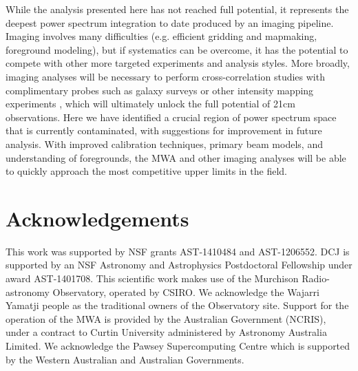 \documentclass[iop]{emulateapj}
\begin{document}
While the analysis presented here has not reached full potential, it represents the deepest power spectrum 
integration to date produced by an imaging pipeline. Imaging involves many difficulties (e.g. 
efficient gridding and mapmaking, foreground modeling), but if systematics can be 
overcome, it has the potential to compete with other more targeted experiments and 
analysis styles. 
More broadly, imaging analyses will be necessary to perform cross-correlation studies
with complimentary probes such as galaxy surveys or other intensity mapping experiments
 \citep[e.g.][]{DeBoer:2016, Vrbanec:2016, Beardsley:2015, Silva:2015, Dore:2014, Lidz:2009}, which will ultimately unlock the full potential of 21cm observations.
Here we have identified a crucial region of power spectrum space that is 
currently contaminated, with suggestions for improvement in future analysis. With improved 
calibration techniques, primary beam models, and understanding of foregrounds, the MWA 
and other imaging analyses will be able to quickly approach the most competitive upper 
limits in the field.

\section{Acknowledgements}
This work was supported by NSF grants AST-1410484 and AST-1206552.
DCJ is supported by an NSF Astronomy and Astrophysics Postdoctoral Fellowship
under award AST-1401708.
This scientific work makes use of the Murchison Radio-astronomy Observatory, operated by 
CSIRO. We acknowledge the Wajarri Yamatji people as the traditional owners of the 
Observatory site. Support for the operation of the MWA is provided by the Australian 
Government (NCRIS), under a contract to Curtin University administered by Astronomy 
Australia Limited. We acknowledge the Pawsey Supercomputing Centre which is supported 
by the Western Australian and Australian Governments.


\end{document}
